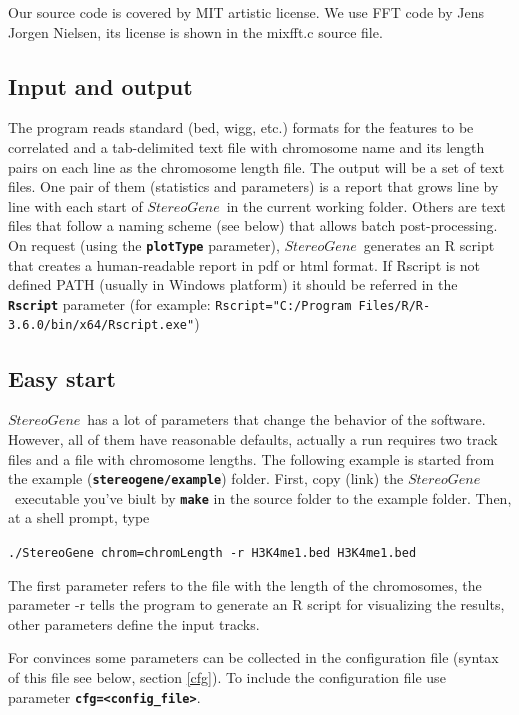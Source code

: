 \documentclass{article}
\newcommand{\prm}[1]{\texttt{\textbf{{#1}}}}
\newcommand{\sg}{$StereoGene$\ }
\begin{document}
Our source code is covered by MIT artistic license. We use FFT code by Jens Jorgen Nielsen, its license is shown in the mixfft.c source file.

\subsection{Input and output}
The program reads standard (bed, wigg, etc.) formats for the features to be correlated and a tab-delimited text file with chromosome name and its length pairs on each line as the chromosome length file. The output will be a set of text files. One pair of them (statistics and parameters) is a report that grows line by line with each start of \sg in the current working folder. Others are text files that follow a naming scheme (see below) that allows batch post-processing. On request (using the \prm{plotType} parameter), \sg generates an R script that creates a human-readable report in pdf or html format. If Rscript is not defined PATH (usually in Windows platform) it should be referred in the \prm{Rscript} parameter (for example: \texttt{Rscript="C:/Program Files/R/R-3.6.0/bin/x64/Rscript.exe"})
\subsection{Easy start}
\sg has a lot of parameters that change the behavior of the software.  However, all of them have reasonable defaults, actually a run requires two track files and a file with chromosome lengths. The following example is started from the example (\prm{stereogene/example}) folder. First, copy (link) the \sg executable you've biult by \prm{make} in the source folder to the example folder. Then, at a shell prompt, type \vspace{0.5cm}

\begin{center}
\texttt{./StereoGene chrom=chromLength -r H3K4me1.bed H3K4me1.bed}\vspace{0.5cm}
\end{center}

The first parameter refers to the file with the length of the chromosomes, the parameter -r tells the program to generate an R script for visualizing the results, other parameters define the input tracks.

For convinces some parameters can be collected in the configuration file (syntax of this file see below, section \ref{cfg}).
To include the configuration file use parameter \prm{cfg=<config\_file>}.
\end{document}

